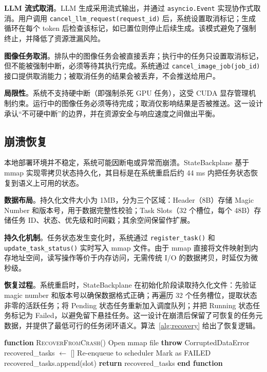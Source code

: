 \textbf{LLM 流式取消}。LLM 生成采用流式输出，并通过 \texttt{asyncio.Event} 实现协作式取消。用户调用 \texttt{cancel\_llm\_request(request\_id)} 后，系统设置取消标记；生成循环在每个 token 后检查该标记，如已置位则停止后续生成。该模式避免了强制终止，并降低了资源泄漏风险。

\textbf{图像任务取消}。排队中的图像任务会被直接丢弃；执行中的任务只设置取消标记，但不能被强制中断，必须等待其执行完成。系统通过 \texttt{cancel\_image\_job(job\_id)} 接口提供取消能力；被取消任务的结果会被丢弃，不会推送给用户。

\textbf{局限性}。系统不支持硬中断（即强制杀死 GPU 任务），这受 CUDA 显存管理机制约束。运行中的图像任务必须等待完成；取消仅影响结果是否被推送。这一设计承认“不可硬中断”的边界，并在资源安全与响应速度之间做出平衡。

\subsection{崩溃恢复}

本地部署环境并不稳定，系统可能因断电或异常而崩溃。StateBackplane 基于 mmap 实现零拷贝状态持久化，其目标是在系统重启后约 44 ms 内把任务状态恢复到语义上可用的状态。

\textbf{数据布局}。持久化文件大小为 1MB，分为三个区域：Header（8B）存储 Magic Number 和版本号，用于数据完整性校验；Task Slots（32 个槽位，每个 48B）存储任务 ID、状态、优先级和时间戳；其余空间保留作扩展。

\textbf{持久化机制}。任务状态发生变化时，系统通过 \texttt{register\_task()} 和 \texttt{update\_task\_status()} 实时写入 mmap 文件。由于 mmap 直接将文件映射到内存地址空间，读写操作等价于内存访问，无需传统 I/O 的数据拷贝，时延仅为微秒级。

\textbf{恢复过程}。系统重启时，StateBackplane 在初始化阶段读取持久化文件：先验证 magic number 和版本号以确保数据格式正确；再遍历 32 个任务槽位，提取状态非零的活跃任务；将 Pending 状态任务重新加入调度队列；并把 Running 状态任务标记为 Failed，以避免留下悬挂任务。这一设计在崩溃后保留了可恢复的任务元数据，并提供了最低可行的任务闭环语义。算法~\ref{alg:recovery} 给出了恢复逻辑。

\begin{algorithm}[!t]
\caption{崩溃恢复流程}
\label{alg:recovery}
\begin{algorithmic}[1]
\STATE \textbf{function} \textsc{RecoverFromCrash}()
\STATE Open mmap file
    \STATE \textbf{throw} CorruptedDataError
\ENDIF
\STATE recovered\_tasks $\leftarrow$ []
            \STATE Re-enqueue to scheduler
            \STATE Mark as FAILED
        \ENDIF
        \STATE recovered\_tasks.append(slot)
    \ENDIF
\ENDFOR
\STATE \textbf{return} recovered\_tasks
\STATE \textbf{end function}
\end{algorithmic}
\end{algorithm}